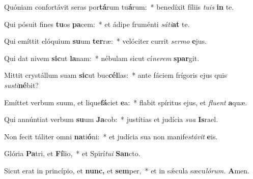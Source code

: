\item Quóniam confortávit seras por\textbf{tá}rum tu\textbf{á}rum:~* benedíxit fíliis \textit{tuis} \textbf{in} te.
\item Qui pósuit fines \textbf{tu}os \textbf{pa}cem:~* et ádipe fruménti \textit{sáti}\textbf{at} te.
\item Qui emíttit elóquium \textbf{su}um \textbf{ter}ræ:~* velóciter currit \textit{sermo} \textbf{e}jus.
\item Qui dat nivem \textbf{sic}ut \textbf{la}nam:~* nébulam sicut cí\textit{nerem} \textbf{spar}git.
\item Mittit crystállum suam \textbf{sic}ut buc\textbf{cél}las:~* ante fáciem frígoris ejus quis \textit{susti}\textbf{né}bit?
\item Emíttet verbum suum, et lique\textbf{fá}ciet \textbf{e}a:~* flabit spíritus ejus, et \textit{fluent} \textbf{a}quæ.
\item Qui annúntiat verbum \textbf{su}um \textbf{Ja}cob:~* justítias et judícia \textit{sua} \textbf{Is}rael.
\item Non fecit táliter omni \textbf{na}ti\textbf{ó}ni:~* et judícia sua non manife\tinyhspace\textit{stávit} \textbf{e}is.
\item Glória \textbf{Pa}tri, et \textbf{Fí}lio,~* et Spirí\tinyhspace\textit{tui} \textbf{San}cto.
\item Sicut erat in princípio, et \textbf{nunc,} et \textbf{sem}per,~* et in sǽcula sæcu\tinyhspace\textit{lórum.} \textbf{A}men.
